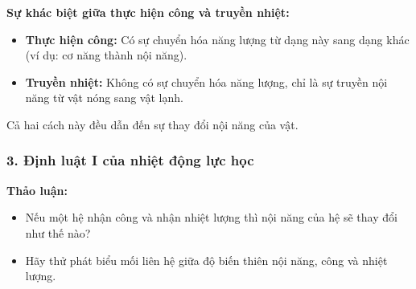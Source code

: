 \begin{emcobiet}
\textbf{Sự khác biệt giữa thực hiện công và truyền nhiệt:}
\begin{itemize}
    \item \textbf{Thực hiện công:} Có sự chuyển hóa năng lượng từ dạng này sang dạng khác (ví dụ: cơ năng thành nội năng).
    \item \textbf{Truyền nhiệt:} Không có sự chuyển hóa năng lượng, chỉ là sự truyền nội năng từ vật nóng sang vật lạnh.
\end{itemize}
Cả hai cách này đều dẫn đến sự thay đổi nội năng của vật.
\end{emcobiet}

\subsubsection{3. Định luật I của nhiệt động lực học}
\begin{hoatdong}
\textbf{Thảo luận:}
\begin{itemize}
    \item Nếu một hệ nhận công và nhận nhiệt lượng thì nội năng của hệ sẽ thay đổi như thế nào?
    \item Hãy thử phát biểu mối liên hệ giữa độ biến thiên nội năng, công và nhiệt lượng.
\end{itemize}
\end{hoatdong}

